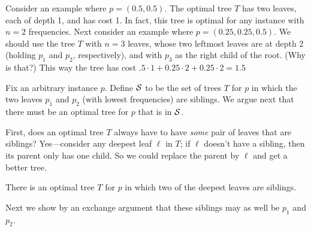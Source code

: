 Consider an example where $p=(0.5, 0.5)$.
The optimal tree $T$ has two leaves, each of depth 1, and has cost 1.
In fact, this tree is optimal for any instance with $n=2$ frequencies.
Next consider an example where $p=(0.25, 0.25, 0.5)$.
We should use the tree $T$ with $n=3$ leaves,
whose two leftmost leaves are at depth 2 (holding $p_1$ and $p_2$, respectively),
and with $p_3$ as the right child of the root.
(Why is that?)
This way the tree has cost $.5\cdot 1 +0.25\cdot 2+0.25\cdot 2 = 1.5$

\newcommand{\calT}{{\cal T}}
\newcommand{\Trees}{\ensuremath{{\cal S}}}

Fix an arbitrary instance $p$.
Define $\Trees$ to be the set of trees $T$ for $p$
in which the two leaves $p_1$ and $p_2$ (with lowest frequencies) are siblings. 
We argue next that there must be an optimal tree for $p$ that is in $\Trees$.

First, does an optimal tree $T$ always have to have \emph{some}
pair of leaves that are siblings?
Yes---consider any deepest leaf $\ell$ in $T$;
if $\ell$ doesn't have a sibling, then its parent only has one child.
So we could replace the parent by $\ell$ and get a better tree.

\begin{observation}\label{greedy: siblings}
  There is an optimal tree $T$ for $p$ in which two of the deepest leaves are siblings.
\end{observation}

Next we show by an exchange argument that
these siblings may as well be $p_1$ and $p_2$.

